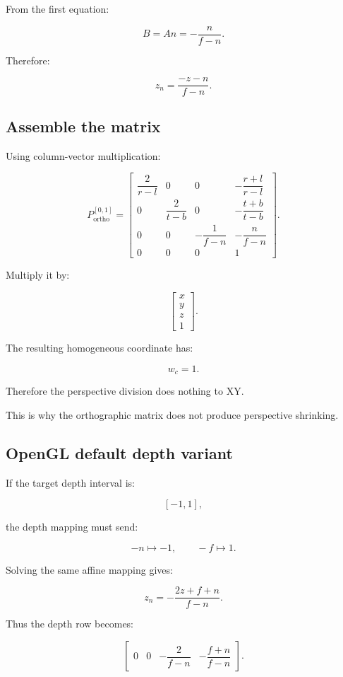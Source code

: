 From the first equation:

\[
 B=An=-\frac n{f-n}.
\]

Therefore:

\[
 \boxed{ z_n=\frac{-z-n}{f-n} }.
\]

\subsection{Assemble the matrix}\label{02-foundations-ii-ch033-assemble-the-matrix}

Using column-vector multiplication:

\[
 \boxed{ P_{\mathrm{ortho}}^{[0,1]}= \begin{bmatrix} \dfrac2{r-l}&0&0&-\dfrac{r+l}{r-l}\\ 0&\dfrac2{t-b}&0&-\dfrac{t+b}{t-b}\\ 0&0&-\dfrac1{f-n}&-\dfrac n{f-n}\\ 0&0&0&1 \end{bmatrix} }.
\]

Multiply it by:

\[
 \begin{bmatrix}x\\y\\z\\1\end{bmatrix}.
\]

The resulting homogeneous coordinate has:

\[
 w_c=1.
\]

Therefore the perspective division does nothing to XY.

This is why the orthographic matrix does not produce perspective shrinking.

\subsection{OpenGL default depth variant}\label{02-foundations-ii-ch033-opengl-default-depth-variant}

If the target depth interval is:

\[
 [-1,1],
\]

the depth mapping must send:

\[
 -n\mapsto-1, \qquad -f\mapsto1.
\]

Solving the same affine mapping gives:

\[
 \boxed{ z_n= -\frac{2z+f+n}{f-n} }.
\]

Thus the depth row becomes:

\[
 \begin{bmatrix} 0&0&-\dfrac2{f-n}&-\dfrac{f+n}{f-n} \end{bmatrix}.
\]

